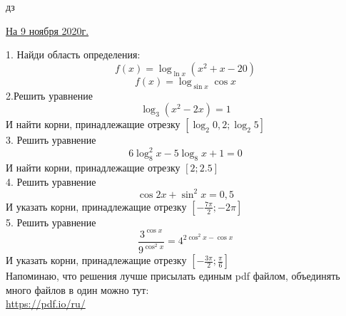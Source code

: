 \documentclass{article}
\begin{document}
\large
\begin{center}
    дз
\end{center}
\begin{flushleft}
\underline{На 9 ноября 2020г.}
\end{flushleft}
1. Найди область определения:
\[ f(x) = \log_{\ln x} (x^2 + x - 20)\]
\[ f(x) = \log_{\sin x} \cos x\]
2.Решить уравнение 
\[ \log_3 (x^2 - 2x) = 1 \]
И найти корни, принадлежащие отрезку \( \left[ \log_2 0,2; \log_2 5 \right] \) \\
3. Решить уравнение 
\[ 6 \log^2_8 x - 5\log_8 x + 1 = 0 \]
И найти корни, принадлежащие отрезку \( \left[ 2; 2.5 \right] \) \\
4. Решить уравнение
\[ \cos 2x + \sin^2 x = 0,5 \]
И указать корни, принадлежащие отрезку \( [-\frac{7\pi}{2}; -2\pi] \) \\
5. Решить уравнение
\[ \frac{3^{\cos x}}{9^{\cos^2 x}} = 4^{2 \cos^2 x - \cos x} \]
И указать корни, принадлежащие отрезку \( [-\frac{3\pi}{2}; \frac{\pi}{6}] \) \\
Напоминаю, что решения лучше присылать единым pdf файлом, объединять много файлов в один можно тут: \\
\href{https://pdf.io/ru/}{https://pdf.io/ru/}
\end{document}
